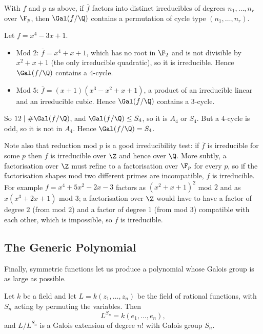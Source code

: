\begin{corollary}\label{cor:dedekind}
	With $f$ and $p$ as above, if $\overline f$ factors into distinct irreducibles of degrees $n_1,\dots,n_r$ over $\F_p$, then $\Gal(f/\Q)$ contains a permutation of cycle type $(n_1,\dots,n_r)$.
\end{corollary}

\begin{example}
	Let $f = x^4 - 3x+1$.
	\begin{itemize}
		\item Mod $2$: $\overline f = x^4+x+1$, which has no root in $\F_2$ and is not divisible by $x^2+x+1$ (the only irreducible quadratic), so it is irreducible. Hence $\Gal(f/\Q)$ contains a $4$-cycle.
		\item Mod $5$: $\overline f = (x+1)(x^3-x^2+x+1)$, a product of an irreducible linear and an irreducible cubic. Hence $\Gal(f/\Q)$ contains a $3$-cycle.
	\end{itemize}
	So $12 \mid \#\Gal(f/\Q)$, and $\Gal(f/\Q) \leq S_4$, so it is $A_4$ or $S_4$. But a $4$-cycle is odd, so it is not in $A_4$. Hence $\Gal(f/\Q) = S_4$.
\end{example}

Note also that reduction mod $p$ is a good irreducibility test: if $\overline f$ is irreducible for some $p$ then $f$ is irreducible over $\Z$ and hence over $\Q$. More subtly, a factorisation over $\Z$ must refine to a factorisation over $\F_p$ for every $p$, so if the factorisation shapes mod two different primes are incompatible, $f$ is irreducible. For example $f = x^4+5x^2-2x-3$ factors as $(x^2+x+1)^2$ mod $2$ and as $x(x^3+2x+1)$ mod $3$; a factorisation over $\Z$ would have to have a factor of degree $2$ (from mod $2$) and a factor of degree $1$ (from mod $3$) compatible with each other, which is impossible, so $f$ is irreducible.

\subsection{The Generic Polynomial}

Finally, symmetric functions let us produce a polynomial whose Galois group is as large as possible.

\begin{theorem}\label{thm:generic}
	Let $k$ be a field and let $L = k(z_1,\dots,z_n)$ be the field of rational functions, with $S_n$ acting by permuting the variables. Then
	$$L^{S_n} = k(e_1,\dots,e_n),$$
	and $L/L^{S_n}$ is a Galois extension of degree $n!$ with Galois group $S_n$.
\end{theorem}

